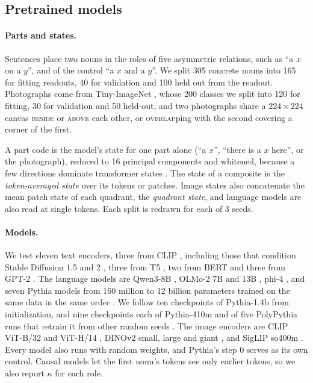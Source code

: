 \documentclass[10pt]{article}
\theoremstyle{plain}
\theoremstyle{remark}
\begin{document}
\subsection{Pretrained models}
\label{sec:design_pretrained}

\paragraph{Parts and states.} Sentences place two nouns in the roles of five asymmetric relations, such as ``a $x$ on a $y$'', and of the control ``a $x$ and a $y$''. We split 305 concrete nouns into 165 for fitting readouts, 40 for validation and 100 held out from the readout. Photographs come from Tiny-ImageNet \citep{le2015tiny}, whose 200 classes we split into 120 for fitting, 30 for validation and 50 held-out, and two photographs share a $224 \times 224$ canvas \textsc{beside} or \textsc{above} each other, or \textsc{overlap}ping with the second covering a corner of the first.

A part code is the model's state for one part alone (``a $x$'', ``there is a $x$ here'', or the photograph), reduced to 16 principal components and whitened, because a few directions dominate transformer states \citep{timkey2021}. The state of a composite is the \emph{token-averaged state} over its tokens or patches. Image states also concatenate the mean patch state of each quadrant, the \emph{quadrant state}, and language models are also read at single tokens. Each split is redrawn for each of 3 seeds.

\paragraph{Models.} We test eleven text encoders, three from CLIP \citep{radford2021clip}, including those that condition Stable Diffusion 1.5 and 2 \citep{rombach2022}, three from T5 \citep{raffel2020t5}, two from BERT \citep{devlin2019bert} and three from GPT-2 \citep{radford2019gpt2}. The language models are Qwen3-8B \citep{yang2025qwen3}, OLMo-2 7B and 13B \citep{olmo2024olmo2}, phi-4 \citep{abdin2024phi4}, and seven Pythia models from 160 million to 12 billion parameters trained on the same data in the same order \citep{biderman2023pythia}. We follow ten checkpoints of Pythia-1.4b from initialization, and nine checkpoints each of Pythia-410m and of five PolyPythia runs that retrain it from other random seeds \citep{vanderwal2025polypythias}. The image encoders are CLIP ViT-B/32 and ViT-H/14 \citep{radford2021clip,cherti2023}, DINOv2 small, large and giant \citep{oquab2024dinov2}, and SigLIP so400m \citep{zhai2023siglip}. Every model also runs with random weights, and Pythia's step 0 serves as its own control. Causal models let the first noun's tokens see only earlier tokens, so we also report $\kappa$ for each role.
\end{document}

